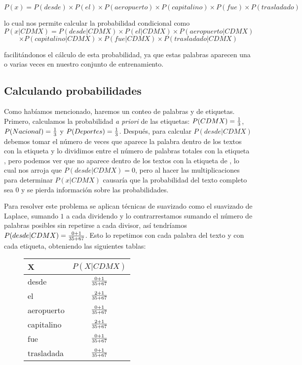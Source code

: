 \[ P(x) = P(desde) \times P(el) \times P(aeropuerto) \times P(capitalino) \times P(fue) \times P(trasladado) \]

lo cual nos permite calcular la probabilidad condicional como
\[ P(x | CDMX) = P(desde|CDMX) \times P(el|CDMX) \times P(aeropuerto|CDMX) \]
\[ \times P(capitalino|CDMX) \times P(fue|CDMX) \times P(trasladado|CDMX) \]

facilitándonos el cálculo de esta probabilidad, ya que estas palabras aparecen una o varias veces en nuestro conjunto de entrenamiento.

\subsection{Calculando probabilidades}

Como habíamos mencionado, haremos un conteo de palabras y de etiquetas. Primero, calculamos la probabilidad \textit{a priori} de las etiquetas: \(P(CDMX) = {1 \over 3}\), \(P(Nacional) = {1 \over 3}\) y \(P(Deportes) = {1 \over 3}\). Después, para calcular \(P(desde|CDMX)\) debemos tomar el número de veces que aparece la palabra  dentro de los textos con la etiqueta  y lo dividimos entre el número de palabras totales con la etiqueta , pero podemos ver que  no aparece dentro de los textos con la etiqueta de , lo cual nos arroja que \(P(desde|CDMX) = 0\), pero al hacer las multiplicaciones para determinar \(P(x| CDMX)\) causaría que la probabilidad del texto completo sea $0$ y se pierda información sobre las probabilidades.

Para resolver este problema se aplican técnicas de suavizado \parencite[ver][202]{ManningSchutze1999} como el suavizado de Laplace, sumando $1$ a cada dividendo y lo contrarrestamos sumando el número de palabras posibles sin repetirse a cada divisor, así tendríamos \(P(desde|CDMX) = {{0 + 1} \over {35 + 67} }\). Esto lo repetimos con cada palabra del texto  y con cada etiqueta, obteniendo las siguientes tablas:

\begin{figure}[H]
  \begin{center}
    \begin{tabular}{ l | c }
      X & $P(X|CDMX)$ \\ \hline
      desde & $0 + 1 \over {35 + 67}$ \\ \hline
      el & $2 + 1 \over {35 + 67}$ \\ \hline
      aeropuerto & $0 + 1 \over {35 + 67}$ \\ \hline
      capitalino & $2 + 1 \over {35 + 67}$ \\ \hline
      fue & $0 + 1 \over {35 + 67}$ \\ \hline
      trasladada & $0 + 1 \over {35 + 67}$ \\
    \end{tabular}
  \end{center}
\end{figure}

